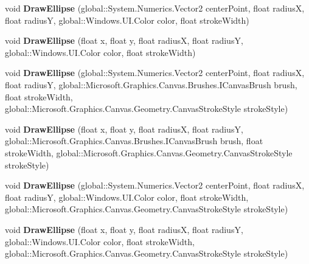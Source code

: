 \begin{DoxyCompactItemize}
void {\bfseries Draw\+Ellipse} (global\+::\+System.\+Numerics.\+Vector2 center\+Point, float radiusX, float radiusY, global\+::\+Windows.\+U\+I.\+Color color, float stroke\+Width)
\item 
\mbox{\label{class_microsoft_1_1_graphics_1_1_canvas_1_1_canvas_drawing_session_a9b0446388e80dc69a1a899682e3e1be9}} 
void {\bfseries Draw\+Ellipse} (float x, float y, float radiusX, float radiusY, global\+::\+Windows.\+U\+I.\+Color color, float stroke\+Width)
\item 
\mbox{\label{class_microsoft_1_1_graphics_1_1_canvas_1_1_canvas_drawing_session_aec377136857c05db63fdc819a9b607c9}} 
void {\bfseries Draw\+Ellipse} (global\+::\+System.\+Numerics.\+Vector2 center\+Point, float radiusX, float radiusY, global\+::\+Microsoft.\+Graphics.\+Canvas.\+Brushes.\+I\+Canvas\+Brush brush, float stroke\+Width, global\+::\+Microsoft.\+Graphics.\+Canvas.\+Geometry.\+Canvas\+Stroke\+Style stroke\+Style)
\item 
\mbox{\label{class_microsoft_1_1_graphics_1_1_canvas_1_1_canvas_drawing_session_ab9d765ab0eb1de32b301c64e51f8e27e}} 
void {\bfseries Draw\+Ellipse} (float x, float y, float radiusX, float radiusY, global\+::\+Microsoft.\+Graphics.\+Canvas.\+Brushes.\+I\+Canvas\+Brush brush, float stroke\+Width, global\+::\+Microsoft.\+Graphics.\+Canvas.\+Geometry.\+Canvas\+Stroke\+Style stroke\+Style)
\item 
\mbox{\label{class_microsoft_1_1_graphics_1_1_canvas_1_1_canvas_drawing_session_a2d442e65f89c2d0144de192be4cb8d9f}} 
void {\bfseries Draw\+Ellipse} (global\+::\+System.\+Numerics.\+Vector2 center\+Point, float radiusX, float radiusY, global\+::\+Windows.\+U\+I.\+Color color, float stroke\+Width, global\+::\+Microsoft.\+Graphics.\+Canvas.\+Geometry.\+Canvas\+Stroke\+Style stroke\+Style)
\item 
\mbox{\label{class_microsoft_1_1_graphics_1_1_canvas_1_1_canvas_drawing_session_a0187ff11ec04e18e8ddddf5fb34cce39}} 
void {\bfseries Draw\+Ellipse} (float x, float y, float radiusX, float radiusY, global\+::\+Windows.\+U\+I.\+Color color, float stroke\+Width, global\+::\+Microsoft.\+Graphics.\+Canvas.\+Geometry.\+Canvas\+Stroke\+Style stroke\+Style)

\end{DoxyCompactItemize}
